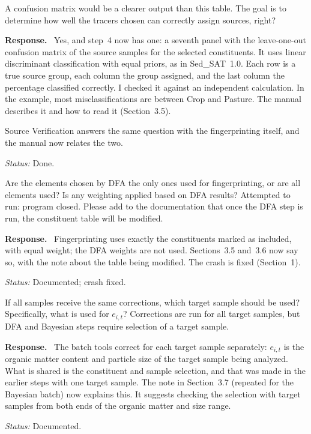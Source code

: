 \documentclass[11pt]{article}
\newcounter{cmt}
\newcounter{grp}
\renewcommand{\thecmt}{\thegrp.\arabic{cmt}}
\newenvironment{reviewer}[1]{%
  \refstepcounter{cmt}%
  \begin{tcolorbox}[enhanced,breakable,colback=commentbg,colframe=usgsgreen!60,
    boxrule=0.4pt,left=6pt,right=6pt,top=4pt,bottom=4pt,
    title={\small\textbf{Comment \thecmt}\hfill\textit{#1}},
    coltitle=black,colbacktitle=usgsgreen!15,fonttitle=\small]}%
  {\end{tcolorbox}}
\newenvironment{response}{\par\noindent\textbf{Response.}\ }{\par\medskip}
\newcommand{\status}[1]{\par\noindent\textit{Status:} #1\par}
\begin{document}
\begin{reviewer}{Multi-way discriminant function analysis, Fig.~2.11}
A confusion matrix would be a clearer output than this table. The goal is to
determine how well the tracers chosen can correctly assign sources, right?
\end{reviewer}
\begin{response}
Yes, and step~4 now has one: a seventh panel with the leave-one-out confusion
matrix of the source samples for the selected constituents. It uses linear
discriminant classification with equal priors, as in Sed\_SAT~1.0. Each row is
a true source group, each column the group assigned, and the last column the
percentage classified correctly. I checked it against an independent
calculation. In the example, most misclassifications are between Crop and
Pasture. The manual describes it and how to read it (Section~3.5).

Source Verification answers the same question with the fingerprinting itself,
and the manual now relates the two.
\end{response}
\status{Done.}

\begin{reviewer}{Fingerprinting}
Are the elements chosen by DFA the only ones used for fingerprinting, or are all
elements used? Is any weighting applied based on DFA results? Attempted to run:
program closed. Please add to the documentation that once the DFA step is run,
the constituent table will be modified.
\end{reviewer}
\begin{response}
Fingerprinting uses exactly the constituents marked as included, with equal
weight; the DFA weights are not used. Sections~3.5 and~3.6 now say so, with the
note about the table being modified. The crash is fixed (Section~1).
\end{response}
\status{Documented; crash fixed.}

\begin{reviewer}{Fingerprinting (Batch)}
If all samples receive the same corrections, which target sample should be used?
Specifically, what is used for $e_{i,t}$? Corrections are run for all target
samples, but DFA and Bayesian steps require selection of a target sample.
\end{reviewer}
\begin{response}
The batch tools correct for each target sample separately: $e_{i,t}$ is the
organic matter content and particle size of the target sample being analyzed.
What is shared is the constituent and sample selection, and that was made in
the earlier steps with one target sample. The note in Section~3.7 (repeated
for the Bayesian batch) now explains this. It suggests checking the selection
with target samples from both ends of the organic matter and size range.
\end{response}
\status{Documented.}
\end{document}
